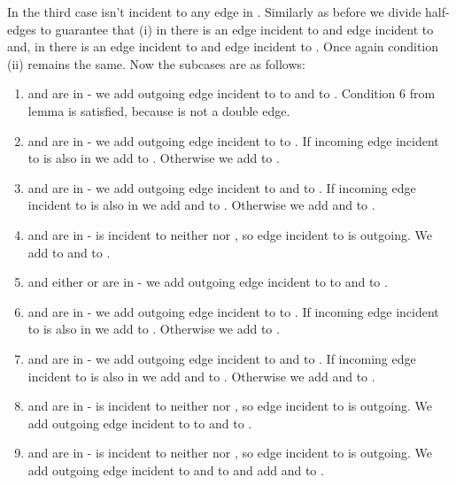 \documentclass[a4, 11pt]{article}
\newcommand{\<}{\langle}
\renewcommand{\>}{\rangle}
\begin{document}
In the third case  isn't incident to any edge in . Similarly as before we divide half-edges to guarantee that (i) in  there is an edge incident to  and edge incident to  and, in  there is an edge incident to  and edge incident to . Once again condition (ii) remains the same. Now the subcases are as follows:
\begin{enumerate}
	\item  and  are in  - we add outgoing edge incident to  to  and  to . Condition 6 from lemma is satisfied, because  is not a double edge.
	\item  and  are in  - we add outgoing edge incident to  to . If incoming edge incident to  is also in  we add  to . Otherwise we add  to .
	\item  and  are in  - we add outgoing edge incident to  and  to . If incoming edge incident to  is also in  we add  and  to . Otherwise we add  and  to .
	\item  and  are in  -  is incident to neither  nor , so edge incident to  is outgoing. We add  to  and  to .
	\item  and either  or  are in  - we add outgoing edge incident to  to  and  to .
	\item  and  are in  - we add outgoing edge incident to  to . If incoming edge incident to  is also in  we add  to . Otherwise we add  to .
	\item  and  are in  - we add outgoing edge incident to  and  to . If incoming edge incident to  is also in  we add  and  to . Otherwise we add  and  to .
	\item  and  are in  -  is incident to neither  nor , so edge incident to  is outgoing. We add outgoing edge incident to  to  and  to .
	\item  and  are in  -  is incident to neither  nor , so edge incident to  is outgoing. We add outgoing edge incident to  and  to  and add  and  to .
\end{enumerate}
\end{document}
